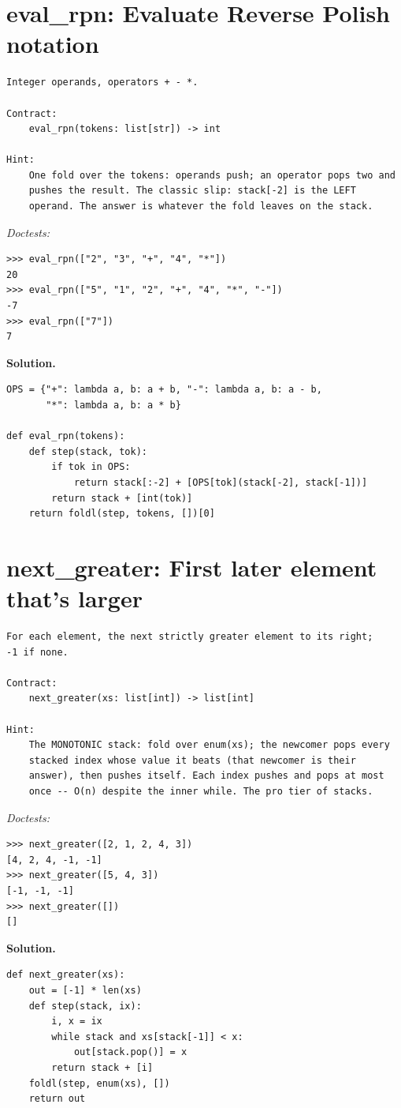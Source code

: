 \documentclass[11pt,letterpaper]{book}
\begin{document}
\section{eval\_rpn: Evaluate Reverse Polish notation}
\begin{lstlisting}[style=spec]
Integer operands, operators + - *.

Contract:
    eval_rpn(tokens: list[str]) -> int

Hint:
    One fold over the tokens: operands push; an operator pops two and
    pushes the result. The classic slip: stack[-2] is the LEFT
    operand. The answer is whatever the fold leaves on the stack.
\end{lstlisting}
\noindent\textit{Doctests:}
\begin{lstlisting}[style=spec]
>>> eval_rpn(["2", "3", "+", "4", "*"])
20
>>> eval_rpn(["5", "1", "2", "+", "4", "*", "-"])
-7
>>> eval_rpn(["7"])
7
\end{lstlisting}
\noindent\textbf{Solution.}
\begin{lstlisting}[style=code]
OPS = {"+": lambda a, b: a + b, "-": lambda a, b: a - b,
       "*": lambda a, b: a * b}

def eval_rpn(tokens):
    def step(stack, tok):
        if tok in OPS:
            return stack[:-2] + [OPS[tok](stack[-2], stack[-1])]
        return stack + [int(tok)]
    return foldl(step, tokens, [])[0]
\end{lstlisting}

\section{next\_greater: First later element that's larger}
\begin{lstlisting}[style=spec]
For each element, the next strictly greater element to its right;
-1 if none.

Contract:
    next_greater(xs: list[int]) -> list[int]

Hint:
    The MONOTONIC stack: fold over enum(xs); the newcomer pops every
    stacked index whose value it beats (that newcomer is their
    answer), then pushes itself. Each index pushes and pops at most
    once -- O(n) despite the inner while. The pro tier of stacks.
\end{lstlisting}
\noindent\textit{Doctests:}
\begin{lstlisting}[style=spec]
>>> next_greater([2, 1, 2, 4, 3])
[4, 2, 4, -1, -1]
>>> next_greater([5, 4, 3])
[-1, -1, -1]
>>> next_greater([])
[]
\end{lstlisting}
\noindent\textbf{Solution.}
\begin{lstlisting}[style=code]
def next_greater(xs):
    out = [-1] * len(xs)
    def step(stack, ix):
        i, x = ix
        while stack and xs[stack[-1]] < x:
            out[stack.pop()] = x
        return stack + [i]
    foldl(step, enum(xs), [])
    return out
\end{lstlisting}
\end{document}
